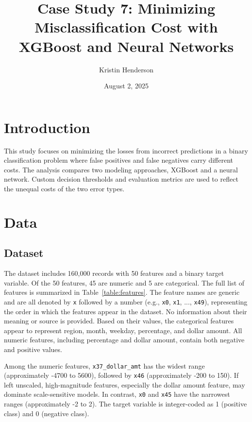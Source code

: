 \documentclass{article}
\title{Case Study 7: Minimizing Misclassification Cost with XGBoost and Neural Networks}
\author{Kristin Henderson}
\date{August 2, 2025}        %
\begin{document}
\maketitle

\section{Introduction}

This study focuses on minimizing the losses from incorrect predictions in a binary classification problem where false positives and false negatives carry different costs. The analysis compares two modeling approaches, XGBoost and a neural network. Custom decision thresholds and evaluation metrics are used to reflect the unequal costs of the two error types.

\section{Data}

\subsection{Dataset}

The dataset includes 160,000 records with 50 features and a binary target variable. Of the 50 features, 45 are numeric and 5 are categorical. The full list of features is summarized in Table~\ref{table:features}. The feature names are generic and are all denoted by \texttt{x} followed by a number (e.g., \texttt{x0}, \texttt{x1}, ..., \texttt{x49}), representing the order in which the features appear in the dataset. No information about their meaning or source is provided. Based on their values, the categorical features appear to represent region, month, weekday, percentage, and dollar amount. All numeric features, including percentage and dollar amount, contain both negative and positive values.

Among the numeric features, \texttt{x37\_dollar\_amt} has the widest range (approximately -4700 to 5600), followed by \texttt{x46} (approximately -200 to 150). If left unscaled, high-magnitude features, especially the dollar amount feature, may dominate scale-sensitive models. In contrast, \texttt{x0} and \texttt{x45} have the narrowest ranges (approximately -2 to 2). The target variable is integer-coded as 1 (positive class) and 0 (negative class).
\end{document}
